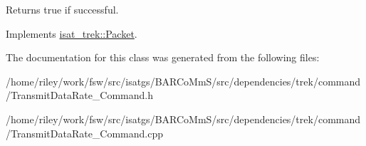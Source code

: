 \begin{DoxyReturn}{Returns}
true if successful. 
\end{DoxyReturn}


Implements \hyperlink{classisat__trek_1_1_packet}{isat\+\_\+trek\+::\+Packet}.



The documentation for this class was generated from the following files\+:\begin{DoxyCompactItemize}
\item 
/home/riley/work/fsw/src/isatgs/\+B\+A\+R\+Co\+Mm\+S/src/dependencies/trek/command/Transmit\+Data\+Rate\+\_\+\+Command.\+h\item 
/home/riley/work/fsw/src/isatgs/\+B\+A\+R\+Co\+Mm\+S/src/dependencies/trek/command/Transmit\+Data\+Rate\+\_\+\+Command.\+cpp\end{DoxyCompactItemize}
